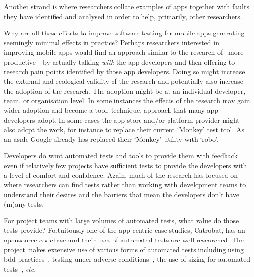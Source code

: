 Another strand is where researchers collate examples of apps together with faults they have identified and analysed in order to help, primarily, other researchers. 

Why are all these efforts to improve software testing for mobile apps generating seemingly minimal effects in practice? Perhaps researchers interested in improving mobile apps would find an approach similar to the research of~ more productive - by actually talking \emph{with} the app developers and then offering to research pain points identified by those app developers. Doing so might increase the external and ecological validity of the research and potentially also increase the adoption of the research. The adoption might be at an individual developer, team, or organisation level. In some instances the effects of the research may gain wider adoption and become a tool, technique, approach that many app developers adopt. In some cases the app store and/or platform provider might also adopt the work, for instance to replace their current `Monkey' test tool. As an aside Google already has replaced their `Monkey' utility with `robo'.

Developers do want automated tests and tools to provide them with feedback~ even if relatively few projects have sufficient tests to provide the developers with a level of comfort and confidence. Again, much of the research has focused on where researchers can find tests rather than working with development teams to understand their desires and the barriers that mean the developers don't have (m)any tests. 

For project teams with large volumes of automated tests, what value do those tests provide? Fortuitously one of the app-centric case studies, Catrobat, has an opensource codebase and their uses of automated tests are well researched. The  project makes extensive use of various forms of automated tests including using \Gls{bdd} practices~, testing under adverse conditions~, the use of sizing for automated tests~, \emph{etc}. %





